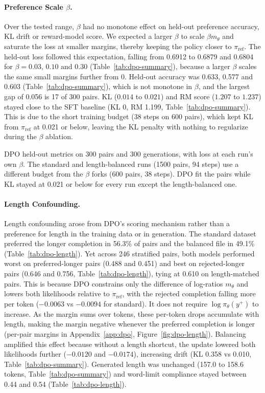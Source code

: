\documentclass{article}
\newcommand{\tablebody}[1]{\small\setlength{\tabcolsep}{4pt}\begin{adjustbox}{max width=\linewidth}\end{adjustbox}}
\begin{document}
\paragraph{Preference Scale $\beta$.} Over the tested range, $\beta$ had no monotone effect on held-out preference accuracy, KL drift or reward-model score. We expected a larger $\beta$ to scale $\beta m_\theta$ and saturate the loss at smaller margins, thereby keeping the policy closer to $\pi_{\text{ref}}$. The held-out loss followed this expectation, falling from 0.6912 to 0.6879 and 0.6804 for $\beta = 0.03$, $0.10$ and $0.30$ (Table~\ref{tab:dpo-summary}), because a larger $\beta$ scales the same small margins further from 0. Held-out accuracy was 0.633, 0.577 and 0.603 (Table~\ref{tab:dpo-summary}), which is not monotone in $\beta$, and the largest gap of 0.056 is 17 of 300 pairs. KL ($0.014$ to $0.021$) and RM score ($1.207$ to $1.237$) stayed close to the SFT baseline (KL 0, RM 1.199, Table~\ref{tab:dpo-summary}). This is due to the short training budget (38 steps on 600 pairs), which kept KL from $\pi_{\text{ref}}$ at 0.021 or below, leaving the KL penalty with nothing to regularize during the $\beta$ ablation.

\begin{table}[!htb]
  \centering
  \caption{DPO held-out metrics on 300 pairs and 300 generations, with loss at each run's own $\beta$. The standard and length-balanced runs (1500 pairs, 94 steps) use a different budget from the $\beta$ forks (600 pairs, 38 steps). DPO fit the pairs while KL stayed at 0.021 or below for every run except the length-balanced one.}
  \label{tab:dpo-summary}
  \tablebody{tables/t1_summary.tex}
\end{table}

\paragraph{Length Confounding.} Length confounding arose from DPO's scoring mechanism rather than a preference for length in the training data or in generation. The standard dataset preferred the longer completion in 56.3\% of pairs and the balanced file in 49.1\% (Table~\ref{tab:dpo-length}). Yet across 246 stratified pairs, both models performed worst on preferred-longer pairs (0.488 and 0.451) and best on rejected-longer pairs (0.646 and 0.756, Table~\ref{tab:dpo-length}), tying at 0.610 on length-matched pairs. This is because DPO constrains only the difference of log-ratios $m_\theta$ and lowers both likelihoods relative to $\pi_{\text{ref}}$, with the rejected completion falling more per token ($-0.0063$ vs $-0.0094$ for standard). It does not require $\log \pi_\theta(y^+)$ to increase. As the margin sums over tokens, these per-token drops accumulate with length, making the margin negative whenever the preferred completion is longer (per-pair margins in Appendix~\ref{app:dpo}, Figure~\ref{fig:dpo-length}). Balancing amplified this effect because without a length shortcut, the update lowered both likelihoods further ($-0.0120$ and $-0.0174$), increasing drift (KL 0.358 vs 0.010, Table~\ref{tab:dpo-summary}). Generated length was unchanged (157.0 to 158.6 tokens, Table~\ref{tab:dpo-summary}) and word-limit compliance stayed between 0.44 and 0.54 (Table~\ref{tab:dpo-length}).
\end{document}
